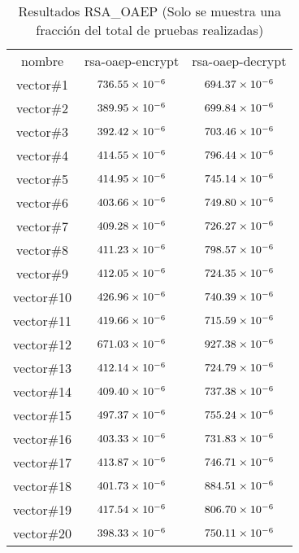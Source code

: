 \documentclass[../main.tex]{subfiles}
\begin{document}
\begin{table}[ht]
\centering{}
  \caption{Resultados RSA\_OAEP (Solo se muestra una fracción del total de pruebas realizadas)}\label{tab:rsa}
  \begin{tabular}{|c|c|c|}
    \rowcolor[HTML]{000000}
    {\color[HTML]{FFFFFF} nombre} & {\color[HTML]{FFFFFF} rsa-oaep-encrypt} & {\color[HTML]{FFFFFF} rsa-oaep-decrypt} \\
    vector\#1  & $\num{736.55E-06}$ & $\num{694.37E-06}$ \\ \hline
    \rowcolor[HTML]{C0C0C0}
    vector\#2  & $\num{389.95E-06}$ & $\num{699.84E-06}$ \\ \hline
    vector\#3  & $\num{392.42E-06}$ & $\num{703.46E-06}$ \\ \hline
    \rowcolor[HTML]{C0C0C0}
    vector\#4  & $\num{414.55E-06}$ & $\num{796.44E-06}$ \\ \hline
    vector\#5  & $\num{414.95E-06}$ & $\num{745.14E-06}$ \\ \hline
    \rowcolor[HTML]{C0C0C0}
    vector\#6  & $\num{403.66E-06}$ & $\num{749.80E-06}$ \\ \hline
    vector\#7  & $\num{409.28E-06}$ & $\num{726.27E-06}$ \\ \hline
    \rowcolor[HTML]{C0C0C0}
    vector\#8  & $\num{411.23E-06}$ & $\num{798.57E-06}$ \\ \hline
    vector\#9  & $\num{412.05E-06}$ & $\num{724.35E-06}$ \\ \hline
    \rowcolor[HTML]{C0C0C0}
    vector\#10 & $\num{426.96E-06}$ & $\num{740.39E-06}$ \\ \hline
    vector\#11 & $\num{419.66E-06}$ & $\num{715.59E-06}$ \\ \hline
    \rowcolor[HTML]{C0C0C0}
    vector\#12 & $\num{671.03E-06}$ & $\num{927.38E-06}$ \\ \hline
    vector\#13 & $\num{412.14E-06}$ & $\num{724.79E-06}$ \\ \hline
    \rowcolor[HTML]{C0C0C0}
    vector\#14 & $\num{409.40E-06}$ & $\num{737.38E-06}$ \\ \hline
    vector\#15 & $\num{497.37E-06}$ & $\num{755.24E-06}$ \\ \hline
    \rowcolor[HTML]{C0C0C0}
    vector\#16 & $\num{403.33E-06}$ & $\num{731.83E-06}$ \\ \hline
    vector\#17 & $\num{413.87E-06}$ & $\num{746.71E-06}$ \\ \hline
    \rowcolor[HTML]{C0C0C0}
    vector\#18 & $\num{401.73E-06}$ & $\num{884.51E-06}$ \\ \hline
    vector\#19 & $\num{417.54E-06}$ & $\num{806.70E-06}$ \\ \hline
    \rowcolor[HTML]{C0C0C0}
    vector\#20 & $\num{398.33E-06}$ & $\num{750.11E-06}$ \\ \hline
  \end{tabular}
\end{table}
\end{document}
